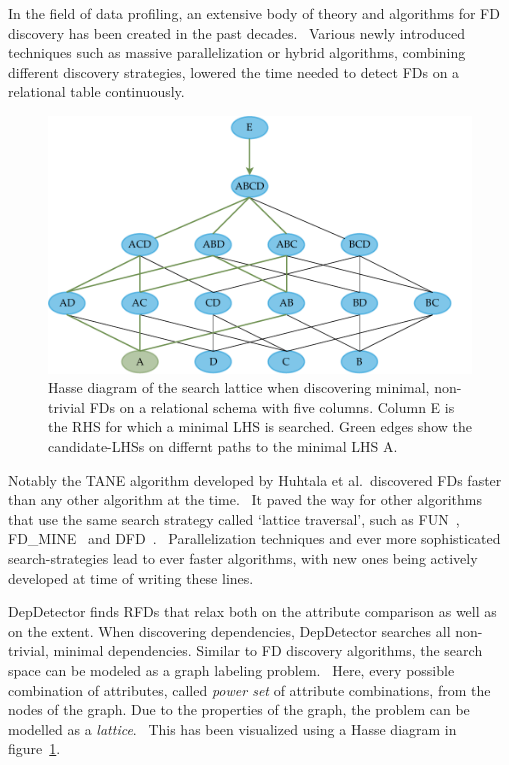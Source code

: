 In the field of data profiling, an extensive body of theory and algorithms for FD discovery has been created in the past decades.~\cite[p.~39]{ABE19}
Various newly introduced techniques such as massive parallelization or hybrid algorithms, combining different discovery strategies, lowered the time needed to detect FDs on a relational table continuously.~\cite[p.~40]{ABE19}

\begin{figure}[ht]
     \centering
     \includegraphics[width=\textwidth]{images/search-lattice-fd.pdf}
     \caption{Hasse diagram of the search lattice when discovering minimal, non-trivial FDs on a relational schema with five columns. Column \textsc{E} is the RHS for which a minimal LHS is searched. Green edges show the candidate-LHSs on differnt paths to the minimal LHS \textsc{A}.}
     \label{fig:dep-detector-search-tree}
 \end{figure}

Notably the \textsc{TANE} algorithm developed by Huhtala et al.\ discovered FDs faster than any other algorithm at the time.~\cite{HUH99}
It paved the way for other algorithms that use the same search strategy called `lattice traversal', such as \textsc{FUN}~\cite{NOV08}, \textsc{FD\_MINE}~\cite{YAO02} and \textsc{DFD}~\cite{ABE14}.~\cite[p.~39]{ABE19}
Parallelization techniques and ever more sophisticated search-strategies lead to ever faster algorithms, with new ones being actively developed at time of writing these lines.~\cite[p.~1]{PAP15}

DepDetector finds RFDs that relax both on the attribute comparison as well as on the extent.
When discovering dependencies, DepDetector searches all non-trivial, minimal dependencies.
Similar to FD discovery algorithms, the search space can be modeled as a graph labeling problem.~\cite[p.~24]{ABE19}
Here, every possible combination of attributes, called \emph{power set} of attribute combinations, from the nodes of the graph.
Due to the properties of the graph, the problem can be modelled as a \emph{lattice}.~\cite[p.~24]{ABE19}
This has been visualized using a Hasse diagram in figure~\ref{fig:dep-detector-search-tree}.

